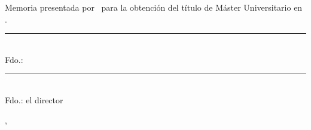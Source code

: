 \thispagestyle{empty}
\begin{center}
  \vspace*{2cm}
  {\fontsize{14}{18}\selectfont\bfseries \tfmtituloactual\par}
  \vspace{3cm}

  {\normalsize
   Memoria presentada por \tfmautoractual\ para la obtenci\'on del t\'itulo de
   M\'aster Universitario en \MakeLowercase{\tfmmasteractual}.\par}
  \vspace{2cm}

  {\normalsize \tfmdirectoractual\par}
  \vspace{3.5cm}

  \begin{minipage}{0.42\textwidth}\centering
    \rule{0.8\textwidth}{0.4pt}\\
    \small Fdo.: \tfmautoractual
  \end{minipage}\hfill
  \begin{minipage}{0.42\textwidth}\centering
    \rule{0.8\textwidth}{0.4pt}\\
    \small Fdo.: el director
  \end{minipage}

  \vfill
  {\normalsize \tfmlugaractual, \tfmfechaactual\par}
\end{center}
\cleardoublepage
